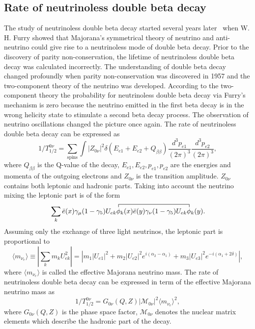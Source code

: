 \subsection{Rate of neutrinoless double beta decay}
\label{sec:0n2brate}
The study of neutrinoless double beta decay started several years
later~\cite{Rac37,Fur37} when W. H. Furry showed that Majorana's
symmetrical theory of neutrino and anti-neutrino could give rise to a
neutrinoless mode of double beta decay. Prior to the discovery of
parity non-conservation, the lifetime of neutrinoless double beta
decay was calculated incorrectly. The understanding of double beta
decay changed profoundly when parity non-conservation was discovered
in 1957 and the two-component theory of the neutrino was developed.
According to the two-component theory the probability for neutrinoless
double beta decay via Furry's mechanism is zero because the neutrino
emitted in the first beta decay is in the wrong helicity state to
stimulate a second beta decay process. The observation of neutrino
oscillations changed the picture once again. The rate of neutrinoless
double beta decay can be expressed as
\begin{equation}
  \label{eq:0nura}
  1/T^{0\nu}_{1/2} = \sum_{\text{spins}} \int |Z_{0\nu}|^{2}
\delta(E_{e1} + E_{e2} + Q_{\beta\beta})
\frac{d^{3}p_{e1}}{(2\pi)^{3}} \frac{d^{3}p_{e2}}{(2\pi)^{3}},
\end{equation}
where $Q_{\beta\beta}$ is the Q-value of the decay, $E_{e1}, E_{e2},
p_{e1}, p_{e2}$ are the energies and momenta of the outgoing electrons
and $Z_{0\nu}$ is the transition amplitude. $Z_{0\nu}$ contains both
leptonic and hadronic parts. Taking into account the neutrino mixing
the leptonic part is of the form
\begin{equation}
  \label{eq:leppar}
  \contraction{\sum_{k}\bar{e}(x)\gamma_{\mu}(1-\gamma_{5})U_{ek}}
  {\phi}{{}_{k}(x)\bar{e}(y)\gamma_{\nu}(1-\gamma_{5})U_{ek}}{\phi}
  \sum_{k}\bar{e}(x)\gamma_{\mu}(1-\gamma_{5})U_{ek}\phi_{k}(x)
  \bar{e}(y)\gamma_{\nu}(1-\gamma_{5})U_{ek}\phi_{k}(y).
\end{equation}
Assuming only the exchange of three light neutrinos, the leptonic part
is proportional to 
\begin{equation}
  \label{eq:effmass}
  \langle m_{\nu_{e}} \rangle \equiv \left| \sum_{k}m_{k}U^{2}_{ek}
\right| = \left| m_{1}|U_{e1}|^{2} +
m_{2}|U_{e2}|^{2}e^{i(\alpha_{2}-\alpha_{1})} +
m_{3}|U_{e3}|^{2}e^{-i(\alpha_{1}+2\delta)} \right|,
\end{equation}
where $\langle m_{\nu_{e}} \rangle$ is called the effective Majorana
neutrino mass. The rate of neutrinoless double beta decay can be
expressed in term of the effective Majorana neutrino mass as
\begin{equation}
  \label{eq:0nurate}
  1/T^{0\nu}_{1/2} = G_{0\nu}(Q,Z) |\mathcal{M}_{0\nu}|^{2} \langle
m_{\nu_{e}} \rangle^{2},
\end{equation}
where $G_{0\nu}(Q,Z)$ is the phase space factor, $\mathcal{M}_{0\nu}$
denotes the nuclear matrix elements which describe the hadronic part
of the decay. 

